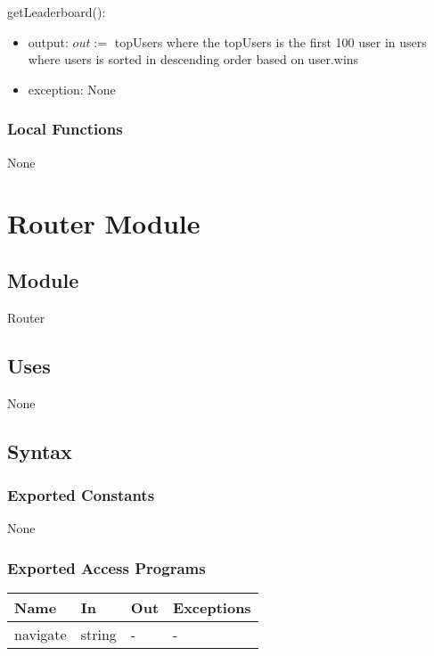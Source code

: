 \documentclass[12pt, titlepage]{article}
\begin{document}
\noindent getLeaderboard():
\begin{itemize}
\item output: $out := $ topUsers where the topUsers is the first 100 user in users where users is sorted in descending order based on user.wins 
\item exception: None
\end{itemize}


\subsubsection{Local Functions}

None

\newpage

\section{Router Module} \label{Router}

\subsection{Module}

Router

\subsection{Uses}

None

\subsection{Syntax}

\subsubsection{Exported Constants}

None

\subsubsection{Exported Access Programs}

\begin{center}
\begin{tabular}{p{2cm} p{4cm} p{2cm} p{2cm}}
\hline
\textbf{Name} & \textbf{In} & \textbf{Out} & \textbf{Exceptions} \\
\hline
navigate & string & - & - \\
\hline
\end{tabular}
\end{center}
\end{document}
